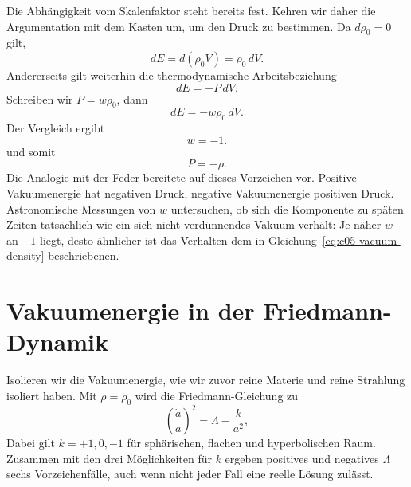Die Abhängigkeit vom Skalenfaktor steht bereits fest. Kehren wir daher die Argumentation mit dem Kasten um, um den Druck zu bestimmen. Da \(d\rho_0=0\) gilt,
\begin{equation}
dE=d(\rho_0V)=\rho_0\,dV.
\end{equation}
Andererseits gilt weiterhin die thermodynamische Arbeitsbeziehung
\begin{equation}
dE=-P\,dV.
\end{equation}
Schreiben wir \(P=w\rho_0\), dann
\begin{equation}
dE=-w\rho_0\,dV.
\end{equation}
Der Vergleich ergibt
\begin{equation}
w=-1.
\end{equation}
und somit
\begin{equation}
P=-\rho.
\end{equation}
Die Analogie mit der Feder bereitete auf dieses Vorzeichen vor. Positive Vakuumenergie hat negativen Druck, negative Vakuumenergie positiven Druck. Astronomische Messungen von \(w\) untersuchen, ob sich die Komponente zu späten Zeiten tatsächlich wie ein sich nicht verdünnendes Vakuum verhält: Je näher \(w\) an \(-1\) liegt, desto ähnlicher ist das Verhalten dem in Gleichung~\eqref{eq:c05-vacuum-density} beschriebenen.

\begin{classroomqa}
\end{classroomqa}

\section{Vakuumenergie in der Friedmann-Dynamik}

Isolieren wir die Vakuumenergie, wie wir zuvor reine Materie und reine Strahlung isoliert haben. Mit \(\rho=\rho_0\) wird die Friedmann-Gleichung zu
\begin{equation}
\left(\frac{\dot a}{a}\right)^2=\Lambda-\frac{k}{a^2},
\label{eq:c05-vacuum-friedmann}
\end{equation}
Dabei gilt \(k=+1,0,-1\) für sphärischen, flachen und hyperbolischen Raum. Zusammen mit den drei Möglichkeiten für \(k\) ergeben positives und negatives \(\Lambda\) sechs Vorzeichenfälle, auch wenn nicht jeder Fall eine reelle Lösung zulässt.

